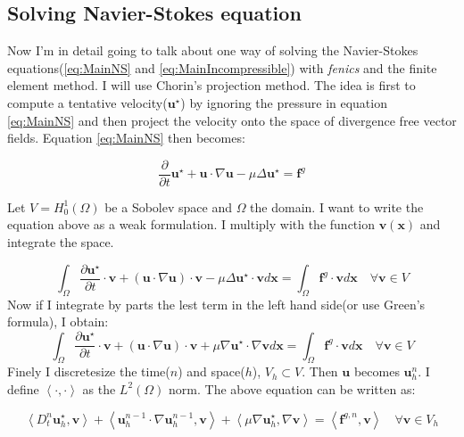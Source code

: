 \documentclass[12pt,a4paper,english]{article}
\begin{document}
\subsection*{Solving Navier-Stokes equation}
Now I'm in detail going to talk about one way of solving the Navier-Stokes equations(\ref{eq:MainNS} and \ref{eq:MainIncompressible}) with \textit{fenics} and the finite element method. I will use Chorin's projection method. The idea is first to compute a tentative velocity($\textbf{u}^\star$) by ignoring the pressure in equation \ref{eq:MainNS} and then project the velocity onto the space of divergence free vector fields. Equation \ref{eq:MainNS} then becomes:

$$
\frac{\partial}{\partial t} \textbf{u}^\star + \textbf{u} \cdot \nabla \textbf{u} - \mu \Delta \textbf{u}^\star = \textbf{f}^g
$$

Let $V = H^{1}_{0}\left( \Omega \right) $ be a Sobolev space and $\Omega$ the domain. I want to write the equation above as a weak formulation. I multiply with the function $\textbf{v}\left(\textbf{x} \right)$ and integrate the space.

$$
\int_\Omega \frac{\partial \textbf{u}^\star}{\partial t} \cdot \textbf{v} + \left( \textbf{u} \cdot \nabla \textbf{u}\right) \cdot \textbf{v} -\mu \Delta \textbf{u}^\star \cdot \textbf{v} d\textbf{x} = \int_\Omega \textbf{f}^g \cdot \textbf{v} d\textbf{x} \quad \forall \textbf{v} \in V
$$
Now if I integrate by parts the lest term in the left hand side(or use Green's formula), I obtain:
$$
\int_\Omega \frac{\partial \textbf{u}^\star}{\partial t} \cdot \textbf{v} + \left( \textbf{u} \cdot \nabla \textbf{u}\right) \cdot \textbf{v} +\mu \nabla \textbf{u}^\star \cdot \nabla \textbf{v} d\textbf{x} = \int_\Omega \textbf{f}^g \cdot \textbf{v} d\textbf{x} \quad \forall \textbf{v} \in V
$$
Finely I discretesize the time($n$) and space($h$), $V_h\subset V$. Then $\textbf{u}$ becomes $\textbf{u}^{n}_{h}$. I define $\left\langle \cdot , \cdot \right\rangle$ as the $L^2\left( \Omega \right)$ norm. The above equation can be written as:

\begin{equation}
\left\langle D^{n}_{t} \textbf{u}^{\star}_{h} , \textbf{v} \right\rangle + \left\langle \textbf{u}^{n-1}_{h} \cdot \nabla \textbf{u}^{n-1}_{h} , \textbf{v} \right\rangle +  \left\langle \mu \nabla \textbf{u}^{\star}_{h} , \nabla \textbf{v} \right\rangle = \left\langle \textbf{f}^{g,n} , \textbf{v} \right\rangle \quad \forall \textbf{v} \in V_h
\label{eq:discreteNS}
\end{equation}
  
\end{document}
